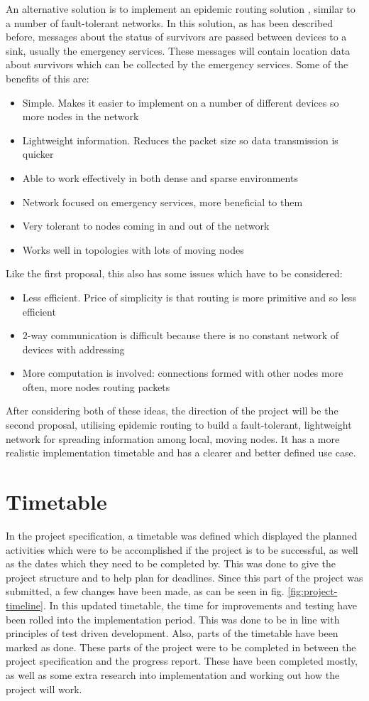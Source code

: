 \documentclass{report}
\begin{document}
An alternative solution is to implement an epidemic routing solution \cite{choksatid2016efficient}, similar to a number of fault-tolerant networks. In this solution, as has been described before, messages about the status of survivors are passed between devices to a sink, usually the emergency services. These messages will contain location data about survivors which can be collected by the emergency services. Some of the benefits of this are:
\begin{itemize}
    \item Simple. Makes it easier to implement on a number of different devices so more nodes in the network
    \item Lightweight information. Reduces the packet size so data transmission is quicker
    \item Able to work effectively in both dense and sparse environments
    \item Network focused on emergency services, more beneficial to them
    \item Very tolerant to nodes coming in and out of the network
    \item Works well in topologies with lots of moving nodes
\end{itemize}
Like the first proposal, this also has some issues which have to be considered:
\begin{itemize}
    \item Less efficient. Price of simplicity is that routing is more primitive and so less efficient
    \item 2-way communication is difficult because there is no constant network of devices with addressing
    \item More computation is involved: connections formed with other nodes more often, more nodes routing packets
\end{itemize}
After considering both of these ideas, the direction of the project will be the second proposal, utilising epidemic routing to build a fault-tolerant, lightweight network for spreading information among local, moving nodes. It has a more realistic implementation timetable and has a clearer and better defined use case.  

\section{Timetable}
In the project specification, a timetable was defined which displayed the planned activities which were to be accomplished if the project is to be successful, as well as the dates which they need to be completed by. This was done to give the project structure and to help plan for deadlines. Since this part of the project was submitted, a few changes have been made, as can be seen in fig. \ref{fig:project-timeline}. In this updated timetable, the time for improvements and testing have been rolled into the implementation period. This was done to be in line with principles of test driven development. Also, parts of the timetable have been marked as done. These parts of the project were to be completed in between the project specification and the progress report. These have been completed mostly, as well as some extra research into implementation and working out how the project will work.
\end{document}
